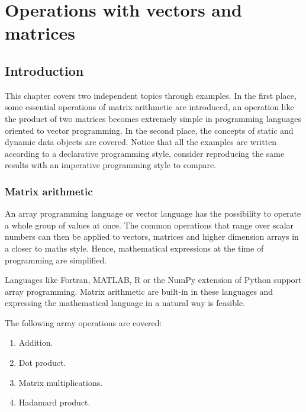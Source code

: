 \chapter{Operations with vectors and matrices}    \label{chap:matrices}


\vspace{-.7cm}
\section{Introduction}

This chapter covers two independent topics through examples. 
In the first place, some essential operations of matrix arithmetic are introduced, 
an operation like the product of two matrices becomes extremely simple 
in programming languages oriented to vector programming. 
In the second place, the concepts of static and dynamic data objects are covered. 
Notice that all the examples are written according to a declarative programming style, 
consider reproducing the same results with an imperative programming style to compare.
    
    \vspace{-.3cm}
    \subsection*{Matrix arithmetic}
    \vspace{-.2cm}

An array programming language or vector language has the possibility 
to operate a whole group of values at once.
The common operations that range over scalar numbers can then be applied to vectors, 
matrices and higher dimension arrays in a closer to maths style. 
Hence, mathematical expressions at the time of programming are simplified.

Languages like Fortran, MATLAB, R or the NumPy extension of Python support array programming.
Matrix arithmetic are built-in in these languages and expressing the mathematical language in a natural way is feasible.

\newpage
The following array operations are covered:
\begin{enumerate}
    \item Addition. 
    \item Dot product.
    \item Matrix multiplications. 
    \item Hadamard product. 
\end{enumerate}  


